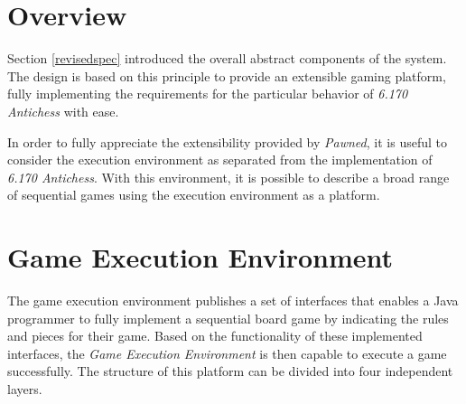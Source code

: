 \section{Overview}
	
	Section \ref{revisedspec} introduced the overall abstract components of the system. The design is based on this 
	principle to provide an extensible gaming platform, fully implementing the requirements for the particular
	behavior of \emph{6.170 Antichess} with ease. 
	
	In order to fully appreciate the extensibility provided by \emph{Pawned}, it is useful to consider the execution environment 		as separated from the implementation of  \emph{6.170 Antichess}. With this environment, it is possible to describe a broad 		
	range of sequential games using the execution environment as a platform. 

\section{Game Execution Environment}
	
	The game execution environment publishes a set of interfaces that enables a Java programmer to fully implement a sequential 
	board game by indicating the rules and pieces for their game. Based on the functionality of these implemented interfaces,
	the \emph{Game Execution Environment} is then capable to execute a game successfully. The structure of this platform can 
	be divided into four independent layers. 

